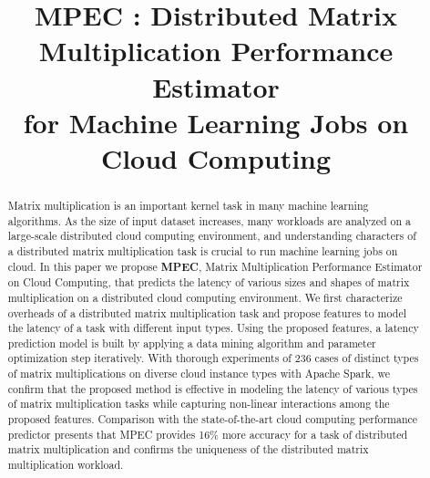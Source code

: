 \documentclass[10pt, conference, compsocconf]{IEEEtran}
\begin{document}

\title{MPEC : Distributed Matrix Multiplication Performance Estimator \\for Machine Learning Jobs on Cloud Computing}


\author{
\and
{}
}

\maketitle

\begin{abstract}
  Matrix multiplication is an important kernel task in many machine learning algorithms. As the size of input dataset increases, many workloads are analyzed on a large-scale distributed cloud computing environment, and understanding characters of a distributed matrix multiplication task is crucial to run machine learning jobs on cloud. In this paper we propose \textbf{MPEC}, Matrix Multiplication Performance Estimator on Cloud Computing, that predicts the latency of various sizes and shapes of matrix multiplication on a distributed cloud computing environment. We first characterize overheads of a distributed matrix multiplication task and propose features to model the latency of a task with different input types. Using the proposed features, a latency prediction model is built by applying a data mining algorithm and parameter optimization step iteratively. With thorough experiments of 236 cases of distinct types of matrix multiplications on diverse cloud instance types with Apache Spark, we confirm that the proposed method is effective in modeling the latency of various types of matrix multiplication tasks while capturing non-linear interactions among the proposed features. Comparison with the state-of-the-art cloud computing performance predictor presents that MPEC provides 16\% more accuracy for a task of distributed matrix multiplication and confirms the uniqueness of the distributed matrix multiplication workload.
\end{abstract}
\end{document}
